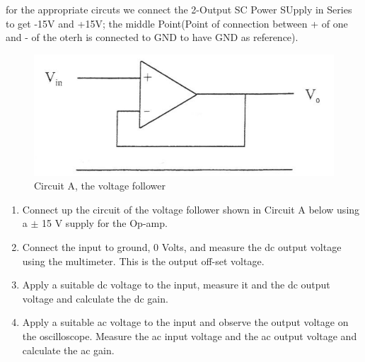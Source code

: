 



for the appropriate circuts we connect the 2-Output SC Power SUpply in Series to get -15V and +15V; the middle Point(Point of connection between + of one and - of the oterh is connected to GND to have GND as reference).





\begin{figure}[H] %
\begin{center}
\includegraphics[width=1\linewidth]{LabTwo/a}
\end{center}
\caption{Circuit A, the voltage follower}
\label{fig:2_voltage}
\end{figure}

\begin{enumerate}
	
\item Connect up the circuit of the voltage follower shown in Circuit A below using a $\pm$ 15 V
supply for the Op-amp.
\item  Connect the input to ground, 0 Volts, and measure the dc output voltage using the multimeter. This is the output off-set voltage.
\item  Apply a suitable dc voltage to the input, measure it and the dc output voltage and calculate
the dc gain.
\item  Apply a suitable ac voltage to the input and observe the output voltage on the oscilloscope.
Measure the ac input voltage and the ac output voltage and calculate the ac gain.
\end{enumerate}



